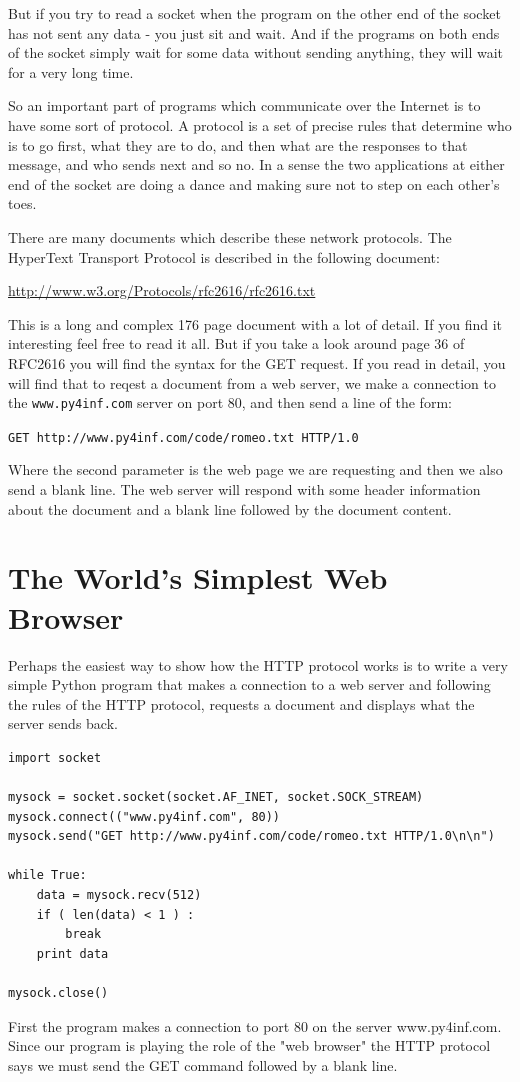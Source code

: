 But if you try to read a socket when the program on the other end of the socket
has not sent any data - you just sit and wait.  And if the programs on both ends
of the socket simply wait for some data without sending anything, they will wait for
a very long time.

So an important part of programs which communicate over the Internet is to have some
sort of protocol.   A protocol is a set of precise rules that determine who
is to go first, what they are to do, and then what are the responses to that message,
and who sends next and so no.  In a sense the two applications at either end 
of the socket are doing a dance and making sure not to step on each other's toes.

There are many documents which describe these network protocols.  The HyperText Transport 
Protocol is described in the following document:

\url{http://www.w3.org/Protocols/rfc2616/rfc2616.txt}

This is a long and complex 176 page document with a lot of detail.  If you 
find it interesting feel free to read it all.  But if you take a look around page 36 of
RFC2616 you will find the syntax for the GET request.  If you read in detail, you will
find that to reqest a document from a web server, we make a connection to 
the {\tt www.py4inf.com} server on port 80, and then send a line of the form:

{\tt GET http://www.py4inf.com/code/romeo.txt HTTP/1.0 }

Where the second parameter is the web page we are requesting and then 
we also send a blank line.  The web server will respond with some 
header information about the document and a blank line
followed by the document content.

\section{The World's Simplest Web Browser}

Perhaps the easiest way to show how the HTTP protocol works is to write a very 
simple Python program that makes a connection to a web server and following
the rules of the HTTP protocol, requests a document 
and displays what the server sends back.

\beforeverb
\begin{verbatim}
import socket

mysock = socket.socket(socket.AF_INET, socket.SOCK_STREAM)
mysock.connect(("www.py4inf.com", 80))
mysock.send("GET http://www.py4inf.com/code/romeo.txt HTTP/1.0\n\n")

while True:
    data = mysock.recv(512)
    if ( len(data) < 1 ) :
        break
    print data

mysock.close()
\end{verbatim}
\afterverb
%
First the program makes a connection to port 80 on 
the server www.py4inf.com.
Since our program is playing the role of the "web browser" the HTTP
protocol says we must send the GET command followed by a blank line.

